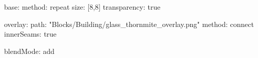 base:
  method: repeat
  size: [8,8]
  transparency: true

overlay:
  path: "Blocks/Building/glass_thornmite_overlay.png"
  method: connect
  innerSeams: true

blendMode: add